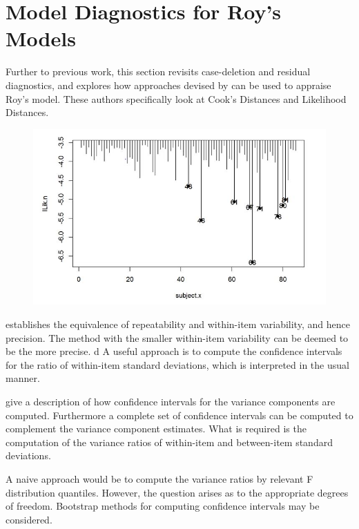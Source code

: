 
\section{Model Diagnostics for Roy's Models}

Further to previous work, this section revisits case-deletion and residual diagnostics, and explores how approaches devised by  \citet{Galecki} can be used to appraise Roy's model. These authors specifically look at Cook's Distances and Likelihood Distances.
%	





\begin{figure}[h!]
	\centering
	\includegraphics[width=0.7\linewidth]{images/LogLik-JS-Roy}
	\caption{}
	\label{fig:LogLik-JS-Roy}                                                                                         
\end{figure}





\citet{ARoy2009} establishes the equivalence of repeatability and within-item variability, and hence precision.  The method with the smaller within-item variability can be deemed to be the more precise.                                              d
A useful approach is to compute the confidence intervals for the ratio of within-item standard deviations, which is interpreted in the usual manner.
%

\citet[pb 93-95]{PB} give a description of how confidence intervals for the variance components are computed. Furthermore a complete set of confidence intervals can be computed to complement the variance component estimates. What is required is the computation of the variance ratios of within-item and between-item standard deviations.

A naive approach would be to compute the variance ratios by relevant F distribution quantiles. However, the question arises as to the appropriate degrees of freedom. Bootstrap methods for computing confidence intervals may be considered.

